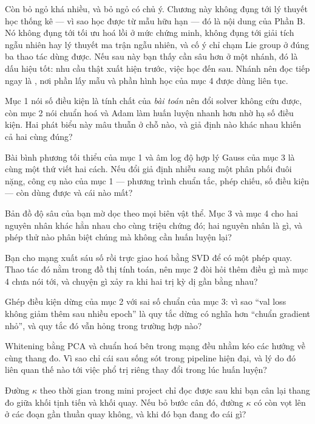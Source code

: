 \documentclass[../../deep_learning.tex]{subfiles}
\begin{document}
Còn bỏ ngỏ khá nhiều, và bỏ ngỏ có chủ ý. Chương này không đụng tới lý thuyết học thống kê --- vì sao học được từ mẫu hữu hạn --- đó là nội dung của Phần B. Nó không đụng tới tối ưu hoá lồi ở mức chứng minh, không đụng tới giải tích ngẫu nhiên hay lý thuyết ma trận ngẫu nhiên, và cố ý chỉ chạm Lie group ở đúng ba thao tác dùng được. Nếu sau này bạn thấy cần sâu hơn ở một nhánh, đó là dấu hiệu tốt: nhu cầu thật xuất hiện trước, việc học đến sau. Nhánh nên đọc tiếp ngay là , nơi phần lấy mẫu và phần hình học của mục 4 được dùng liên tục.
\begin{tukiem}
\item Mục 1 nói số điều kiện là tính chất của \emph{bài toán} nên đổi solver không cứu được, còn mục 2 nói chuẩn hoá và Adam làm huấn luyện nhanh hơn nhờ hạ số điều kiện. Hai phát biểu này mâu thuẫn ở chỗ nào, và giả định nào khác nhau khiến cả hai cùng đúng?
\item Bài bình phương tối thiểu của mục 1 và âm log độ hợp lý Gauss của mục 3 là cùng một thứ viết hai cách. Nếu đổi giả định nhiễu sang một phân phối đuôi nặng, công cụ nào của mục 1 --- phương trình chuẩn tắc, phép chiếu, số điều kiện --- còn dùng được và cái nào mất?
\item Bản đồ độ sâu của bạn mờ dọc theo mọi biên vật thể. Mục 3 và mục 4 cho hai nguyên nhân khác hẳn nhau cho cùng triệu chứng đó; hai nguyên nhân là gì, và phép thử nào phân biệt chúng mà không cần huấn luyện lại?
\item Bạn cho mạng xuất sáu số rồi trực giao hoá bằng SVD để có một phép quay. Thao tác đó nằm trong đồ thị tính toán, nên mục 2 đòi hỏi thêm điều gì mà mục 4 chưa nói tới, và chuyện gì xảy ra khi hai trị kỳ dị gần bằng nhau?
\item Ghép điều kiện dừng của mục 2 với sai số chuẩn của mục 3: vì sao ``val loss không giảm thêm sau nhiều epoch'' là quy tắc dừng có nghĩa hơn ``chuẩn gradient nhỏ'', và quy tắc đó vẫn hỏng trong trường hợp nào?
\item Whitening bằng PCA và chuẩn hoá bên trong mạng đều nhằm kéo các hướng về cùng thang đo. Vì sao chỉ cái sau sống sót trong pipeline hiện đại, và lý do đó liên quan thế nào tới việc phổ trị riêng thay đổi trong lúc huấn luyện?
\item Đường \(\kappa\) theo thời gian trong mini project chỉ đọc được sau khi bạn cân lại thang đo giữa khối tịnh tiến và khối quay. Nếu bỏ bước cân đó, đường \(\kappa\) có còn vọt lên ở các đoạn gần thuần quay không, và khi đó bạn đang đo cái gì?
\end{tukiem}
\ifSubfilesClassLoaded{\printbibliography[title={Nguồn}]}{}
\end{document}
